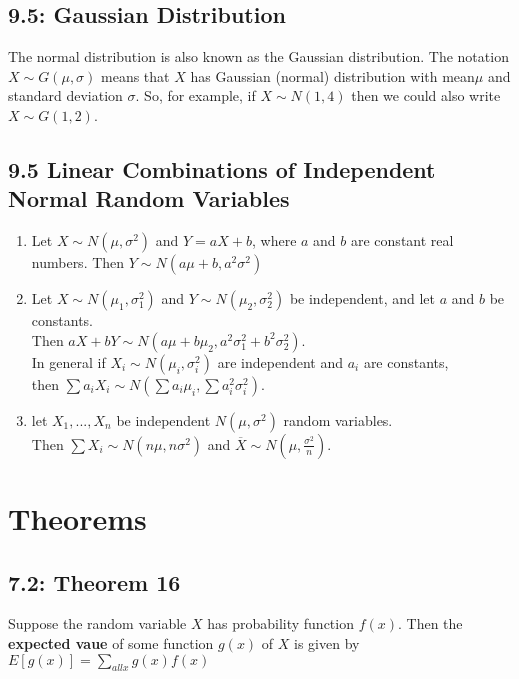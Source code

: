 \documentclass[11pt]{article}
\begin{document}
     	\subsection*{9.5: Gaussian Distribution}
     		The normal distribution is also known as the Gaussian distribution. The notation $X\sim G(\mu,\sigma)$ means that $X$ has Gaussian (normal) distribution with mean$\mu$ and standard deviation $\sigma$. So, for example, if $X\sim N(1,4)$ then we could also write $X\sim G(1,2)$.
		
		\subsection*{9.5 Linear Combinations of Independent Normal Random Variables}
		\begin{enumerate}
			\item Let $X\sim N(\mu,\sigma^2)$ and $Y = aX+b$, where $a$ and $b$ are constant real numbers. Then $Y\sim N(a\mu + b,a^2\sigma^2)$
			
			\item Let $X\sim N(\mu_1,\sigma^2_1)$ and $Y\sim N(\mu_2,\sigma^2_2)$ be independent, and let $a$ and $b$ be constants. \\
			Then $aX+bY \sim N(a\mu+b\mu_2,a^2\sigma_1^2+b^2\sigma_2^2)$.\\
			In general if $X_i \sim N(\mu_i,\sigma^2_i)$ are independent and $a_i$ are constants,\\
			then $\sum a_iX_i \sim
			 N(\sum a_i\mu_i,\sum a_i^2\sigma_i^2)$.
			 
			 \item let $X_1,...,X_n$ be independent $N(\mu,\sigma^2)$ random variables.\\
			 Then $\sum X_i\sim N(n \mu,n\sigma^2)$ and $\overline{X}\sim N(\mu,\frac{\sigma^2}{n})$.
		\end{enumerate}
		

			
\section*{Theorems}
	\subsection*{7.2: Theorem 16}
		Suppose the random variable $X$ has probability function $f(x)$. Then the {\bf expected vaue} of some function $g(x)$ of $X$ is given by\\
		$E[g(x)]=\sum_{all x}g(x)f(x)$
\end{document}

